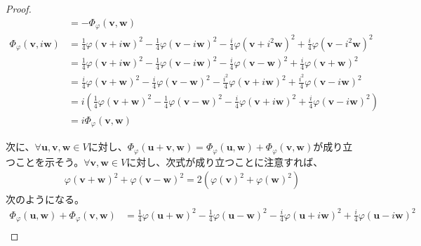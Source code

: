 \documentclass[dvipdfmx]{jsarticle}
\begin{document}
\begin{proof}
\begin{align*}
&= - \varPhi_{\varphi}\left( \mathbf{v},\mathbf{w} \right)\\
\varPhi_{\varphi}\left( \mathbf{v},i\mathbf{w} \right) &= \frac{1}{4}{\varphi\left( \mathbf{v} + i\mathbf{w} \right)}^{2} - \frac{1}{4}{\varphi\left( \mathbf{v} - i\mathbf{w} \right)}^{2} - \frac{i}{4}{\varphi\left( \mathbf{v} + i^{2}\mathbf{w} \right)}^{2} + \frac{i}{4}{\varphi\left( \mathbf{v} - i^{2}\mathbf{w} \right)}^{2}\\
&= \frac{1}{4}{\varphi\left( \mathbf{v} + i\mathbf{w} \right)}^{2} - \frac{1}{4}{\varphi\left( \mathbf{v} - i\mathbf{w} \right)}^{2} - \frac{i}{4}{\varphi\left( \mathbf{v - w} \right)}^{2} + \frac{i}{4}{\varphi\left( \mathbf{v + w} \right)}^{2}\\
&= \frac{i}{4}{\varphi\left( \mathbf{v + w} \right)}^{2} - \frac{i}{4}{\varphi\left( \mathbf{v - w} \right)}^{2} - \frac{i^{2}}{4}{\varphi\left( \mathbf{v} + i\mathbf{w} \right)}^{2} + \frac{i^{2}}{4}{\varphi\left( \mathbf{v} - i\mathbf{w} \right)}^{2}\\
&= i\left( \frac{1}{4}{\varphi\left( \mathbf{v} + \mathbf{w} \right)}^{2} - \frac{1}{4}{\varphi\left( \mathbf{v} - \mathbf{w} \right)}^{2} - \frac{i}{4}{\varphi\left( \mathbf{v} + i\mathbf{w} \right)}^{2} + \frac{i}{4}{\varphi\left( \mathbf{v} - i\mathbf{w} \right)}^{2} \right)\\
&= i\varPhi_{\varphi}\left( \mathbf{v},\mathbf{w} \right)
\end{align*}\par
次に、$\forall\mathbf{u},\mathbf{v},\mathbf{w} \in V$に対し、$\varPhi_{\varphi}\left( \mathbf{u} + \mathbf{v},\mathbf{w} \right) = \varPhi_{\varphi}\left( \mathbf{u},\mathbf{w} \right) + \varPhi_{\varphi}\left( \mathbf{v},\mathbf{w} \right)$が成り立つことを示そう。$\forall\mathbf{v},\mathbf{w} \in V$に対し、次式が成り立つことに注意すれば、
\begin{align*}
{\varphi\left( \mathbf{v} + \mathbf{w} \right)}^{2} + {\varphi\left( \mathbf{v} - \mathbf{w} \right)}^{2} = 2\left( {\varphi\left( \mathbf{v} \right)}^{2} + {\varphi\left( \mathbf{w} \right)}^{2} \right)
\end{align*}
次のようになる。
\begin{align*}
\varPhi_{\varphi}\left( \mathbf{u},\mathbf{w} \right) + \varPhi_{\varphi}\left( \mathbf{v},\mathbf{w} \right) &= \frac{1}{4}{\varphi\left( \mathbf{u} + \mathbf{w} \right)}^{2} - \frac{1}{4}{\varphi\left( \mathbf{u} - \mathbf{w} \right)}^{2} - \frac{i}{4}{\varphi\left( \mathbf{u} + i\mathbf{w} \right)}^{2} + \frac{i}{4}{\varphi\left( \mathbf{u} - i\mathbf{w} \right)}^{2} \\

\end{align*}
\end{proof}
\end{document}
